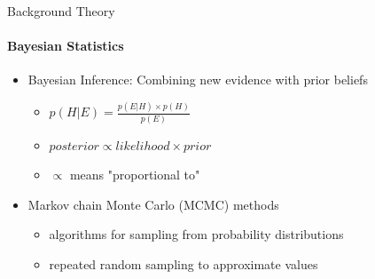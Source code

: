\documentclass[letter,graphicx]{beamer}
\begin{document}
\begin{frame}{Background Theory}
\framesubtitle{Bayesian Statistics}
\begin{itemize}
\item Bayesian Inference: Combining new evidence with prior beliefs
	\vspace{1mm}
	\begin{itemize}
	\item $p(H|E) = \frac{p(E|H) \times p(H)}{p(E)}$
	\vspace{2mm}
	\item $posterior \propto likelihood \times prior$
	\vspace{2mm}
	\item $\propto$ means "proportional to"
	\end{itemize}
	\vspace{2mm}
\item Markov chain Monte Carlo (MCMC) methods
	\vspace{1mm}
	\begin{itemize}
	\item algorithms for sampling from probability distributions
	\vspace{2mm}
	\item repeated random sampling to approximate values
	\end{itemize}
\end{itemize}
\end{frame}
\end{document}
